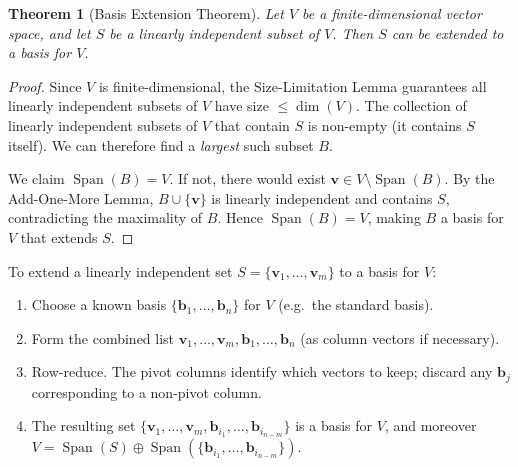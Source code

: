 \documentclass[11pt, a4paper, notitlepage]{report}
\newtheorem{theorem}{Theorem}[section]
\theoremstyle{definition}
\theoremstyle{remark}
\begin{document}
\begin{theorem}[Basis Extension Theorem]\label{thm:basis-extension}
Let $V$ be a finite-dimensional vector space, and let $S$ be a linearly independent subset of $V$. Then $S$ can be extended to a basis for $V$.
\end{theorem}

\begin{proof}
Since $V$ is finite-dimensional, the Size-Limitation Lemma guarantees all linearly independent subsets of $V$ have size $\le\dim(V)$. The collection of linearly independent subsets of $V$ that contain $S$ is non-empty (it contains $S$ itself). We can therefore find a \emph{largest} such subset $B$.

We claim $\operatorname{Span}(B) = V$. If not, there would exist $\mathbf{v}\in V\setminus\operatorname{Span}(B)$. By the Add-One-More Lemma, $B\cup\{\mathbf{v}\}$ is linearly independent and contains $S$, contradicting the maximality of $B$. Hence $\operatorname{Span}(B) = V$, making $B$ a basis for $V$ that extends $S$.
\end{proof}

\begin{examtip}[title={Exam Tip: Extending a Basis Algorithmically}]
To extend a linearly independent set $S = \{\mathbf{v}_1, \ldots, \mathbf{v}_m\}$ to a basis for $V$:
\begin{enumerate}
  \item Choose a known basis $\{\mathbf{b}_1, \ldots, \mathbf{b}_n\}$ for $V$ (e.g.\ the standard basis).
  \item Form the combined list $\mathbf{v}_1, \ldots, \mathbf{v}_m, \mathbf{b}_1, \ldots, \mathbf{b}_n$ (as column vectors if necessary).
  \item Row-reduce. The pivot columns identify which vectors to keep; discard any $\mathbf{b}_j$ corresponding to a non-pivot column.
  \item The resulting set $\{\mathbf{v}_1, \ldots, \mathbf{v}_m, \mathbf{b}_{i_1}, \ldots, \mathbf{b}_{i_{n-m}}\}$ is a basis for $V$, and moreover $V = \operatorname{Span}(S)\oplus\operatorname{Span}(\{\mathbf{b}_{i_1}, \ldots, \mathbf{b}_{i_{n-m}}\})$.
\end{enumerate}
\end{examtip}
\end{document}
